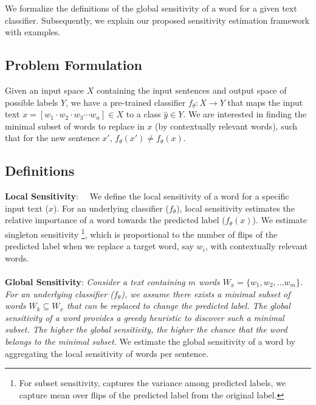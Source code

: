 We formalize the definitions of the global sensitivity of a word for a given text classifier. Subsequently, we explain our proposed sensitivity estimation framework with examples.

\subsection{Problem Formulation}
Given an input space $X$ containing the input sentences and output space of possible labels $Y$, we have a pre-trained classifier \(f_\theta: X \rightarrow Y \) that maps the input text $ x = [w_1 \cdot w_2 \cdot w_3 \cdots w_n]  \in  X $ to a class $\hat{y} \in Y$. We are interested in finding the minimal subset of words to replace in $x$ (by contextually relevant words), such that for the new sentence $x'$, $f_\theta(x') \neq f_\theta(x)$.

\subsection{Definitions}
\label{sec:definitions}
\textbf{Local Sensitivity}:~~  We define the local sensitivity of a word for a specific input text ($x$). For an underlying classifier ($f_\theta$), local sensitivity estimates the relative importance of a word towards the predicted label ($f_\theta(x)$). We estimate singleton sensitivity \cite{hahn-etal-2021-sensitivity}\footnote{For subset sensitivity, \citet{hahn-etal-2021-sensitivity} captures the variance among predicted labels, we capture mean over flips of the predicted label from the original label.}, which is proportional to the number of flips of the predicted label when we replace a target word, say $w_i$, with contextually relevant words. \\
\\
\textbf{Global Sensitivity}: {\it Consider a text containing \(m\) words $W_x = \{w_1, w_2, \ldots w_m \}$. For an underlying classifier ($f_\theta$), we assume there exists a minimal subset of words $W_k \subseteq W_x$ that can be replaced to change the predicted label. The global sensitivity of a word provides a greedy heuristic to discover such a minimal subset. The higher the global sensitivity, the higher the chance that the word belongs to the minimal subset.} We estimate the global sensitivity of a word by aggregating the local sensitivity of words per sentence.  

